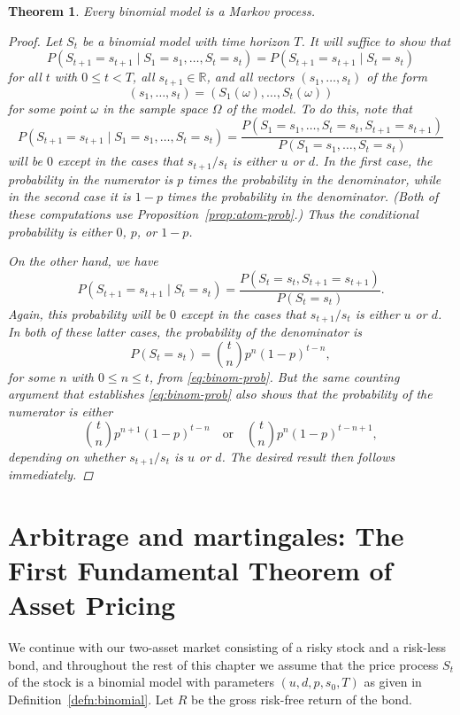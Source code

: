 \documentclass[11pt, openany, oneside]{book}
\newtheorem{thm}{Theorem}[section]
\theoremstyle{definition}
\theoremstyle{remark}
\theoremstyle{boldital}
\numberwithin{equation}{section}
\begin{document}
\begin{thm}
Every binomial model is a Markov process.
\begin{proof}
Let $S_t$ be a binomial model with time horizon $T$. It will suffice to show that
	\[
	P\left(S_{t+1} = s_{t+1} \mid S_1=s_1, \ldots,S_t=s_t\right) = P\left(S_{t+1} = s_{t+1} \mid S_t=s_t\right)
	\]
for all $t$ with $0 \leq t < T$, all $s_{t+1}\in \mathbb{R}$, and all vectors $(s_1,\ldots,s_t)$ of the form
	\[
	(s_1,\ldots,s_t) = (S_1(\omega),\ldots,S_t(\omega))
	\]
for some point $\omega$ in the sample space $\Omega$ of the model. To do this, note that
	\[
	P\left(S_{t+1} = s_{t+1} \mid S_1=s_1, \ldots,S_t=s_t\right) = \frac{P(S_1=s_1, \ldots,S_t=s_t,S_{t+1}=s_{t+1})}{P(S_1=s_1, \ldots,S_t=s_t)}
	\]
will be $0$ except in the cases that $s_{t+1}/s_t$ is either $u$ or $d$. In the first case, the probability in the numerator is $p$ times the probability in the denominator, while in the second case it is $1-p$ times the probability in the denominator. (Both of these computations use Proposition~\ref{prop:atom-prob}.) Thus the conditional probability is either $0$, $p$, or $1-p$.

On the other hand, we have
	\[
	P\left(S_{t+1} = s_{t+1} \mid S_t=s_t\right) = \frac{P(S_t=s_t, S_{t+1}=s_{t+1})}{P(S_t=s_t)}.
	\]
Again, this probability will be $0$ except in the cases that $s_{t+1}/s_t$ is either $u$ or $d$. In both of these latter cases, the probability of the denominator is
	\[
	P(S_t=s_t) = \binom{t}{n} p^n (1-p)^{t-n},
	\]
for some $n$ with $0\leq n \leq t$, from \eqref{eq:binom-prob}. But the same counting argument that establishes \eqref{eq:binom-prob} also shows that the probability of the numerator is either
	\[
	\binom{t}{n} p^{n+1} (1-p)^{t-n} \quad \text{or} \quad \binom{t}{n} p^{n} (1-p)^{t-n+1},
	\]
depending on whether $s_{t+1}/s_t$ is $u$ or $d$. The desired result then follows immediately.
\end{proof}
\end{thm}

\section[Arbitrage and martingales: The First Fundamental Theorem of Asset Pricing]%
        {Arbitrage and martingales: The First Fundamental Theorem of Asset Pricing%
         }%

We continue with our two-asset market consisting of a risky stock and a risk-less bond, and throughout the rest of this chapter we assume that the price process $S_t$ of the stock is a binomial model with parameters $(u,d,p,s_0,T)$ as given in Definition~\ref{defn:binomial}. Let $R$ be the gross risk-free return of the bond.
\end{document}
